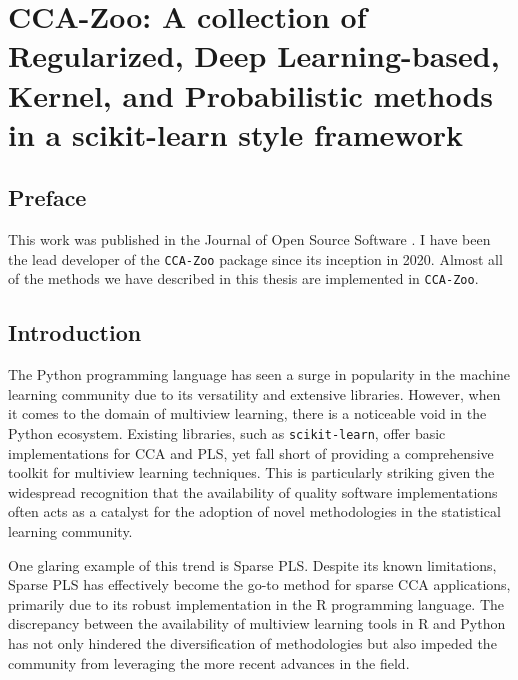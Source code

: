 \graphicspath{{chapters/software/}}


\chapter{CCA-Zoo: A collection of Regularized, Deep Learning-based, Kernel, and Probabilistic methods in a scikit-learn style framework}\label{ch:ccazoo}

\section*{Preface}

This work was published in the Journal of Open Source Software \citep{chapman2021cca}.
I have been the lead developer of the \texttt{CCA-Zoo} package since its inception in 2020.
Almost all of the methods we have described in this thesis are implemented in \texttt{CCA-Zoo}.

\section{Introduction}

The Python programming language has seen a surge in popularity in the machine learning community due to its versatility and extensive libraries.
However, when it comes to the domain of multiview learning, there is a noticeable void in the Python ecosystem.
Existing libraries, such as \texttt{scikit-learn}\cite{pedregosa2011scikit}, offer basic implementations for CCA and PLS, yet fall short of providing a comprehensive toolkit for multiview learning techniques.
This is particularly striking given the widespread recognition that the availability of quality software implementations often acts as a catalyst for the adoption of novel methodologies in the statistical learning community.

One glaring example of this trend is Sparse PLS. Despite its known limitations, Sparse PLS has effectively become the go-to method for sparse CCA applications, primarily due to its robust implementation in the R programming language.
The discrepancy between the availability of multiview learning tools in R and Python has not only hindered the diversification of methodologies but also impeded the community from leveraging the more recent advances in the field.


